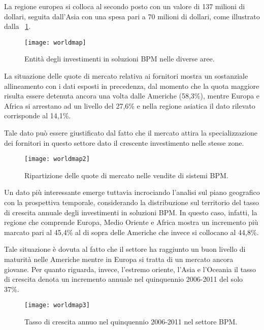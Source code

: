 La regione europea si colloca al secondo posto con un valore di 137 milioni di dollari, seguita dall'Asia con una spesa pari a 70 milioni di dollari, come illustrato dalla \figurename~\ref{fig:map1}.

\begin{figure}[H]
  \centering
  \texttt{[image: worldmap]}
  \caption{Entità degli investimenti in soluzioni BPM nelle diverse aree.}
  \label{fig:map1}
\end{figure}

La situazione delle quote di mercato relativa ai fornitori mostra un sostanziale allineamento con i dati esposti in precedenza, dal momento che la quota maggiore risulta essere detenuta ancora una volta dalle Americhe (58,3\%), mentre Europa e Africa si arrestano ad un livello del 27,6\% e nella regione asiatica il dato rilevato corrisponde al 14,1\%.

Tale dato può essere giustificato dal fatto che il mercato attira la specializzazione dei fornitori in questo settore dato il crescente investimento nelle stesse zone.

\begin{figure}[H]
  \centering
  \texttt{[image: worldmap2]}
  \caption{Ripartizione delle quote di mercato nelle vendite di sistemi BPM.}
  \label{fig:map3}
\end{figure}

Un dato più interessante emerge tuttavia incrociando l'analisi sul piano geografico con la prospettiva temporale, considerando la distribuzione sul territorio del tasso di crescita annuale degli investimenti in soluzioni BPM\@. In questo caso, infatti, la regione che comprende Europa, Medio Oriente e Africa mostra un incremento più marcato pari al 45,4\% al di sopra delle Americhe che invece si collocano al 44,8\%.

Tale situazione è dovuta al fatto che il settore ha raggiunto un buon livello di maturità nelle Americhe mentre in Europa si tratta di un mercato ancora giovane. Per quanto riguarda, invece, l'estremo oriente, l'Asia e l'Oceania il tasso di crescita denota un incremento annuale nel quinquennio 2006-2011 del solo 37\%.

\begin{figure}[H]
  \centering
  \texttt{[image: worldmap3]}
  \caption{Tasso di crescita annuo nel quinquennio 2006-2011 nel settore BPM.}
  \label{fig:map2}
\end{figure}

